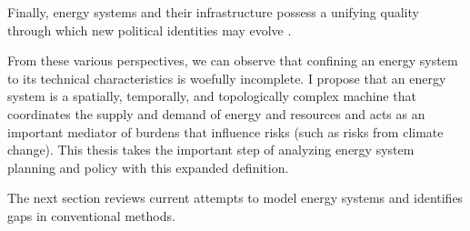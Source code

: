Finally, energy systems and their infrastructure possess a unifying quality
through which new political identities may evolve \cite{bridge_energy_2018}.

From these various perspectives, we can observe that confining an energy system
to its technical characteristics is woefully incomplete. I propose that an
energy system is a spatially, temporally, and topologically complex machine that
coordinates the supply and demand of energy and resources and acts as an important mediator of
burdens that influence risks (such as risks from climate change). This thesis takes the important step
of analyzing energy system planning and policy with this expanded definition.








The next section reviews current attempts to model energy systems and identifies
gaps in conventional methods.
